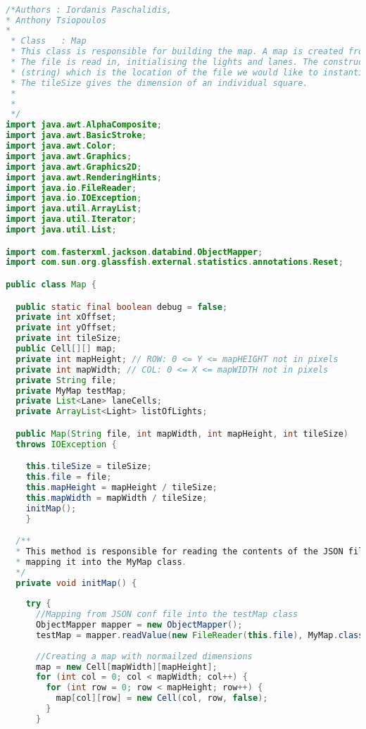 \begin{lstlisting}[language=java]

/*Authors : Iordanis Paschalidis, 
* Anthony Tsiopoulos 
* 
 * Class   : Map
 * This class is responsible for building the map. A map is created from a JSON text file.
 * The file is read in, initialising the lights and lanes. The constructor takes the file
 * (string) which is the location of the file we would like to instantiate the map with.
 * The tileSize gives the dimension of an individual square.  
 *
 * 
 */
import java.awt.AlphaComposite;
import java.awt.BasicStroke;
import java.awt.Color;
import java.awt.Graphics;
import java.awt.Graphics2D;
import java.awt.RenderingHints;
import java.io.FileReader;
import java.io.IOException;
import java.util.ArrayList;
import java.util.Iterator;
import java.util.List;

import com.fasterxml.jackson.databind.ObjectMapper;
import com.sun.org.glassfish.external.statistics.annotations.Reset;

public class Map {

  public static final boolean debug = false;
  private int xOffset;
  private int yOffset;
  private int tileSize;
  public Cell[][] map;
  private int mapHeight; // ROW: 0 <= Y <= mapHEIGHT not in pixels
  private int mapWidth; // COL: 0 <= X <= mapWIDTH not in pixels
  private String file;
  private MyMap testMap;
  private List<Lane> laneCells;
  private ArrayList<Light> listOfLights;

  public Map(String file, int mapWidth, int mapHeight, int tileSize)
  throws IOException {

    this.tileSize = tileSize;
    this.file = file;
    this.mapHeight = mapHeight / tileSize;
    this.mapWidth = mapWidth / tileSize;
    initMap();
    }

  /**
  * This method is responsible for reading the contents of the JSON file and
  * mapping it into the MyMap class.
  */
  private void initMap() {
    
    try {
      //Mapping from JSON conf file into the testMap class
      ObjectMapper mapper = new ObjectMapper();
      testMap = mapper.readValue(new FileReader(this.file), MyMap.class);
      
      //Creating a map with normailzed dimensions 
      map = new Cell[mapWidth][mapHeight];
      for (int col = 0; col < mapWidth; col++) {
        for (int row = 0; row < mapHeight; row++) {
          map[col][row] = new Cell(col, row, false);
        }
      }
      

\end{lstlisting}
